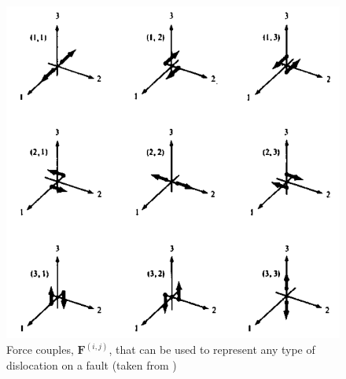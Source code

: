 \documentclass[12pt]{article}
\begin{document}
\begin{figure}
\includegraphics[scale=0.4]{figures/MomentTensor}
\centering
\caption{Force couples, $\boldsymbol{F}^{(i,j)}$, that can
  be used to represent any type of dislocation on a fault (taken from
  \citet{AR2002})}

\end{figure}
\end{document}
